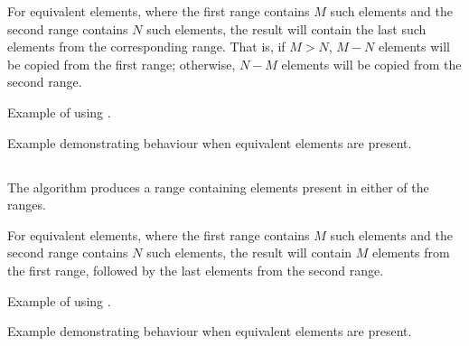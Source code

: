 For equivalent elements, where the first range contains $M$ such elements and the second range contains $N$ such elements, the result will contain the last  such elements from the corresponding range. That is, if $M>N$, $M-N$ elements will be copied from the first range; otherwise, $N-M$ elements will be copied from the second range.

\begin{box-nobreak}
\footnotesize Example of using .
\tcblower
{}
\end{box-nobreak}

\begin{box-note}
\footnotesize Example demonstrating  behaviour when equivalent elements are present.
\tcblower
{}
\end{box-note}

\subsection{\texorpdfstring{}{\texttt{std::set\_union}}}

The  algorithm produces a range containing elements present in either of the ranges.


For equivalent elements, where the first range contains $M$ such elements and the second range contains $N$ such elements, the result will contain $M$ elements from the first range, followed by the last  elements from the second range.

\begin{box-note}
\footnotesize Example of using .
\tcblower
{}
\end{box-note}

\begin{box-note}
\footnotesize Example demonstrating  behaviour when equivalent elements are present.
\tcblower
{}
\end{box-note}

